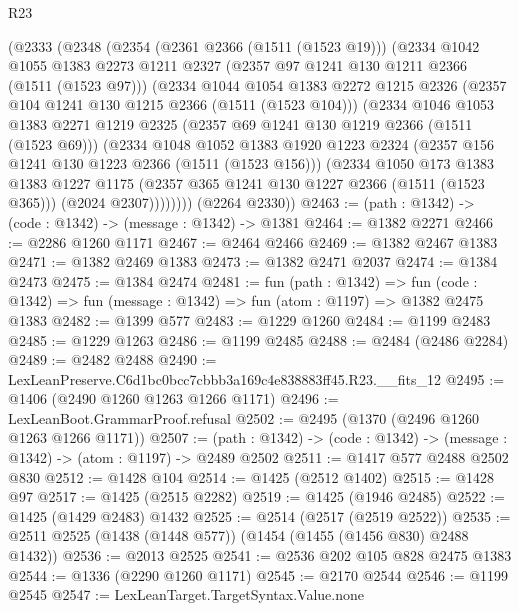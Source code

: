 \begin{lexlean}{R23}
\begin{coremodule}
    (@2333
      (@2348
        (@2354
          (@2361 @2366 (@1511 (@1523 @19)))
          (@2334
            @1042
            @1055
            @1383
            @2273
            @1211
            @2327
            (@2357 @97 @1241 @130 @1211 @2366 (@1511 (@1523 @97)))
            (@2334
              @1044
              @1054
              @1383
              @2272
              @1215
              @2326
              (@2357 @104 @1241 @130 @1215 @2366 (@1511 (@1523 @104)))
              (@2334
                @1046
                @1053
                @1383
                @2271
                @1219
                @2325
                (@2357 @69 @1241 @130 @1219 @2366 (@1511 (@1523 @69)))
                (@2334
                  @1048
                  @1052
                  @1383
                  @1920
                  @1223
                  @2324
                  (@2357 @156 @1241 @130 @1223 @2366 (@1511 (@1523 @156)))
                  (@2334
                    @1050
                    @173
                    @1383
                    @1383
                    @1227
                    @1175
                    (@2357 @365 @1241 @130 @1227 @2366 (@1511 (@1523 @365)))
                    (@2024 @2307))))))))
      (@2264 @2330))
@2463 := (path : @1342) -> (code : @1342) -> (message : @1342) -> @1381
@2464 := @1382 @2271
@2466 := @2286 @1260 @1171
@2467 := @2464 @2466
@2469 := @1382 @2467 @1383
@2471 := @1382 @2469 @1383
@2473 := @1382 @2471 @2037
@2474 := @1384 @2473
@2475 := @1384 @2474
@2481 := fun (path : @1342) =>
  fun (code : @1342) => fun (message : @1342) => fun (atom : @1197) => @1382 @2475 @1383
@2482 := @1399 @577
@2483 := @1229 @1260
@2484 := @1199 @2483
@2485 := @1229 @1263
@2486 := @1199 @2485
@2488 := @2484 (@2486 @2284)
@2489 := @2482 @2488
@2490 := LexLeanPreserve.C6d1bc0bcc7cbbb3a169c4e838883ff45.R23.__fits_12
@2495 := @1406 (@2490 @1260 @1263 @1266 @1171)
@2496 := LexLeanBoot.GrammarProof.refusal
@2502 := @2495 (@1370 (@2496 @1260 @1263 @1266 @1171))
@2507 := (path : @1342) -> (code : @1342) -> (message : @1342) -> (atom : @1197) -> @2489 @2502
@2511 := @1417 @577 @2488 @2502 @830
@2512 := @1428 @104
@2514 := @1425 (@2512 @1402)
@2515 := @1428 @97
@2517 := @1425 (@2515 @2282)
@2519 := @1425 (@1946 @2485)
@2522 := @1425 (@1429 @2483) @1432
@2525 := @2514 (@2517 (@2519 @2522))
@2535 := @2511 @2525 (@1438 (@1448 @577)) (@1454 (@1455 (@1456 @830) @2488 @1432))
@2536 := @2013 @2525
@2541 := @2536 @202 @105 @828 @2475 @1383
@2544 := @1336 (@2290 @1260 @1171)
@2545 := @2170 @2544
@2546 := @1199 @2545
@2547 := LexLeanTarget.TargetSyntax.Value.none

\end{coremodule}
\end{lexlean}
